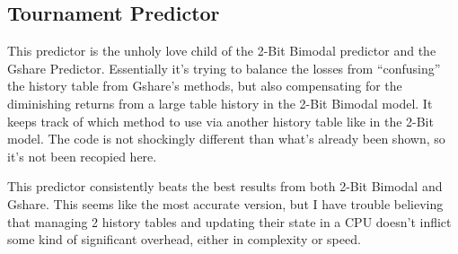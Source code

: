 \documentclass[12pt]{article}
\begin{document}
\subsection{Tournament Predictor}
\label{subsec:label}
 
This predictor is the unholy love child of the 2-Bit Bimodal predictor and the
Gshare Predictor. Essentially it's trying to balance the losses from
``confusing'' the history table from Gshare's methods, but also compensating for
the diminishing returns from a large table history in the 2-Bit Bimodal model.
It keeps track of which method to use via another history table like in the
2-Bit model. The code is not shockingly different than what's already been
shown, so it's not been recopied here.

This predictor consistently beats the best results from both 2-Bit Bimodal and
Gshare. This seems like the most accurate version, but I have trouble believing
that managing 2 history tables and updating their state in a CPU doesn't inflict some
kind of significant overhead, either in complexity or speed.
\end{document}
